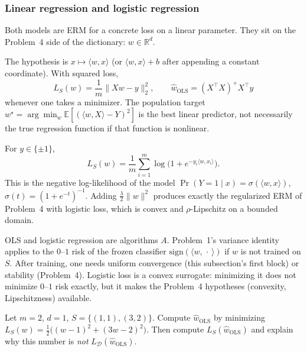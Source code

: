 \subsubsection{Linear regression and logistic regression}
\label{subsubsec:mlu-linlog}

Both models are ERM for a concrete loss on a linear parameter. They sit on the Problem~4 side of the dictionary: $w\in\mathbb{R}^d$.

\begin{definition}
\label{def:mlu-linreg}
The hypothesis is $x\mapsto\langle w,x\rangle$ (or $\langle w,x\rangle+b$ after appending a constant coordinate). With squared loss,
\[
L_S(w)
=
\frac1m\lVert Xw-y\rVert_2^2,
\qquad
\widehat{w}_{\mathrm{OLS}}
=
(X^\top X)^+X^\top y
\]
whenever one takes a minimizer. The population target $w^\star=\arg\min_w\mathbb{E}[(\langle w,X\rangle-Y)^2]$ is the best linear predictor, not necessarily the true regression function if that function is nonlinear.
\end{definition}

\begin{definition}
\label{def:mlu-logreg}
For $y\in\{\pm1\}$,
\[
L_S(w)
=
\frac1m\sum_{i=1}^m\log\bigl(1+e^{-y_i\langle w,x_i\rangle}\bigr).
\]
This is the negative log-likelihood of the model $\Pr(Y=1\mid x)=\sigma(\langle w,x\rangle)$, $\sigma(t)=(1+e^{-t})^{-1}$. Adding $\tfrac{\lambda}{2}\lVert w\rVert^2$ produces exactly the regularized ERM of Problem~4 with logistic loss, which is convex and $\rho$-Lipschitz on a bounded domain.
\end{definition}

\begin{remark}
OLS and logistic regression are algorithms $A$. Problem~1's variance identity applies to the $0$--$1$ risk of the frozen classifier $\mathrm{sign}(\langle w,\,\cdot\,\rangle)$ if $w$ is not trained on $S$. After training, one needs uniform convergence (this subsection's first block) or stability (Problem~4). Logistic loss is a convex surrogate: minimizing it does not minimize $0$--$1$ risk exactly, but it makes the Problem~4 hypotheses (convexity, Lipschitzness) available.
\end{remark}

\begin{exercise}
\label{ex:mlu-ols}
Let $m=2$, $d=1$, $S=\{(1,1),(3,2)\}$. Compute $\widehat{w}_{\mathrm{OLS}}$ by minimizing $L_S(w)=\frac12\bigl((w-1)^2+(3w-2)^2\bigr)$. Then compute $L_S(\widehat{w}_{\mathrm{OLS}})$ and explain why this number is \emph{not} $L_{\mathcal{D}}(\widehat{w}_{\mathrm{OLS}})$.
\end{exercise}

